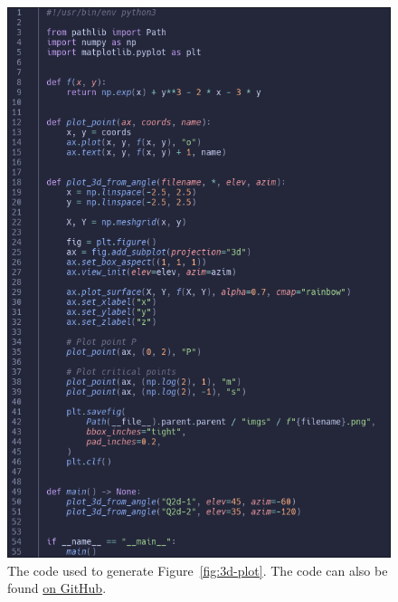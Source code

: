 \documentclass[a4paper]{article}
\begin{document}
\begin{figure}[h]
	\centering
	\includegraphics[scale=0.3]{Q2d-code}
	\caption{The code used to generate Figure~\ref{fig:3d-plot}. The code can also be found \href{https://github.com/DoctorDalek1963/uni/blob/1ee2e9f33bdd8e5d2054b4487684af46f686b5bd/first-year/MA144-Methods-of-Mathematical-Modelling-2/Ass 2/code/plot_surface.py}{on GitHub}.}
\end{figure}

\end{document}
